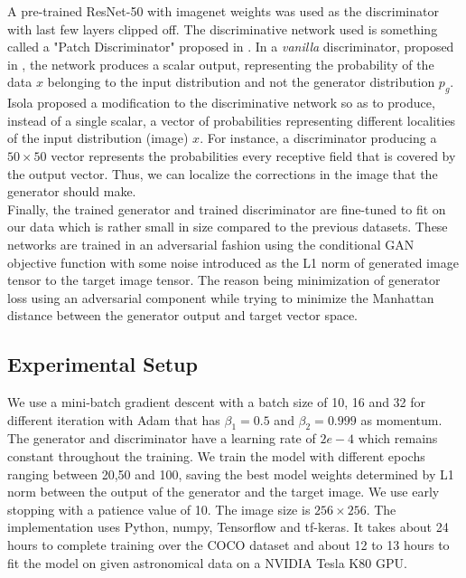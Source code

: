 \documentclass[10pt,twocolumn,letterpaper]{article}
\begin{document}
    \hspace*{0.167 in}A pre-trained ResNet-50 with imagenet weights was used as the discriminator with last few layers clipped off. The discriminative network used is something called a "Patch Discriminator" proposed in \cite{isola2018imagetoimage}. In a \textit{vanilla} discriminator, proposed in \cite{goodfellow2014generative}, the network produces a scalar output, representing the probability of the data $x$ belonging to the input distribution and not the generator distribution $p_g$. Isola \etal\cite{isola2018imagetoimage} proposed a modification to the discriminative network so as to produce, instead of a single scalar, a vector of probabilities representing different localities of the input distribution (image) $x$. For instance, a discriminator producing a $50 \times 50$ vector represents the probabilities every receptive field that is covered by the output vector. Thus, we can localize the corrections in the image that the generator should make.\\
    \hspace*{0.167 in}Finally, the trained generator and trained discriminator are fine-tuned to fit on our data which is rather small in size compared to the previous datasets. These networks are trained in an adversarial fashion using the conditional GAN objective function \cite{isola2018imagetoimage} with some noise introduced as the L1 norm of generated image tensor to the target image tensor. The reason being minimization of generator loss using an adversarial component while trying to minimize the Manhattan distance between the generator output and target vector space.
\subsection{Experimental Setup}
    \hspace*{0.167 in}We use a mini-batch gradient descent with a batch size of 10, 16 and 32 for different iteration with Adam that has $\beta_1 = 0.5$ and $\beta_2 = 0.999$ as momentum. The generator and discriminator have a learning rate of $2e-4$ which remains constant throughout the training. We train the model with different epochs ranging between 20,50 and 100, saving the best model weights determined by L1 norm between the output of the generator and the target image. We use early stopping with a patience value of 10. The image size is $256\times256$. The implementation uses Python, numpy, Tensorflow and tf-keras. It takes about 24 hours to complete training over the COCO dataset and about 12 to 13 hours to fit the model on given astronomical data on a NVIDIA Tesla K80 GPU.
\end{document}
